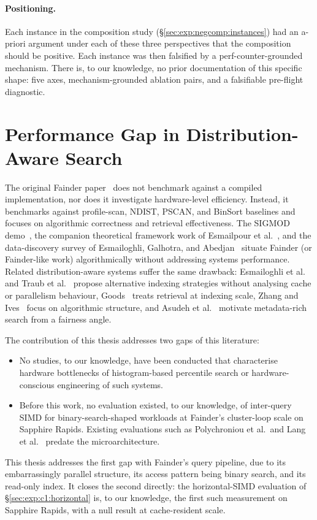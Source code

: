 \paragraph{Positioning.}
Each instance in the composition study (§\ref{sec:exp:negcomp:instances}) had an a-priori argument under each of these three perspectives that the composition should be positive. Each instance was then falsified by a perf-counter-grounded mechanism. There is, to our knowledge, no prior documentation of this specific shape: five axes, mechanism-grounded ablation pairs, and a falsifiable pre-flight diagnostic.


\section{Performance Gap in Distribution-Aware Search}

The original Fainder paper~\cite{behme_2024} does not benchmark against a compiled implementation, nor does it investigate hardware-level efficiency. Instead, it benchmarks against profile-scan, NDIST, PSCAN, and BinSort baselines and focuses on algorithmic correctness and retrieval effectiveness. The SIGMOD demo~\cite{behme_2025_demo}, the companion theoretical framework work of Esmailpour et al.~\cite{esmailpour_2025}, and the data-discovery survey of Esmailoghli, Galhotra, and Abedjan~\cite{abedjan_2025} situate Fainder (or Fainder-like work) algorithmically without addressing systems performance. Related distribution-aware systems suffer the same drawback: Esmailoghli et al.~\cite{EsmailoghliQZ21} and Traub et al.~\cite{TraubGCBKRM20} propose alternative indexing strategies without analysing cache or parallelism behaviour, Goods~\cite{halevy_2016} treats retrieval at indexing scale, Zhang and Ives~\cite{zhang_2018} focus on algorithmic structure, and Asudeh et al.~\cite{asudeh_2022} motivate metadata-rich search from a fairness angle.

The contribution of this thesis addresses two gaps of this literature:

\begin{itemize}
    \item No studies, to our knowledge, have been conducted that characterise hardware bottlenecks of histogram-based percentile search or hardware-conscious engineering of such systems.
    \item Before this work, no evaluation existed, to our knowledge, of inter-query SIMD for binary-search-shaped workloads at Fainder's cluster-loop scale on Sapphire Rapids. Existing evaluations such as Polychroniou et al.\ and Lang et al.~\cite{polychroniou_2014,lang_2020} predate the microarchitecture.
\end{itemize}

This thesis addresses the first gap with Fainder's query pipeline, due to its embarrassingly parallel structure, its access pattern being binary search, and its read-only index. It closes the second directly: the horizontal-SIMD evaluation of §\ref{sec:exp:c1:horizontal} is, to our knowledge, the first such measurement on Sapphire Rapids, with a null result at cache-resident scale.